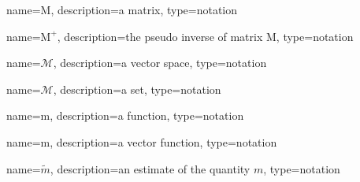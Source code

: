 	\newcommand{\mat}[1]{\ensuremath{\boldsymbol{\mathrm{#1}}}}
	{%
		name=\mat{M},
		description=a matrix,
		type=notation
	}

	\newcommand{\pseudoinv}[1]{\ensuremath{{#1}^{+}}}
	{%
		name=\pseudoinv{\mat{M}},
		description=the pseudo inverse of matrix \mat{M},
		type=notation
	}

	\newcommand{\vecspace}[1]{\ensuremath{\mathscr{#1}}}
	{%
		name=\vecspace{M},
		description=a vector space,
		type=notation
	}

	\newcommand{\set}[1]{\ensuremath{\mathcal{#1}}}
	{%
		name=\set{M},
		description=a set,
		type=notation
	}

	\newcommand{\func}[1]{\ensuremath{\mathrm{#1}}}
	{%
		name=\func{m},
		description=a function,
		type=notation
	}

	\newcommand{\vecfunc}[1]{\ensuremath{\boldsymbol{\mathrm{#1}}}}
	{%
		name=\vecfunc{m},
		description=a vector function,
		type=notation
	}

	\newcommand{\estimate}[1]{\ensuremath{\widetilde{#1}}}
	{%
		name=\estimate{m},
		description=an estimate of the quantity $m$,
		type=notation
	}

